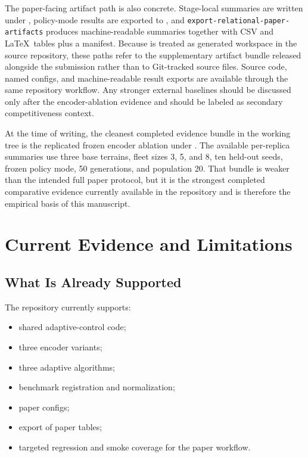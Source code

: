 \documentclass[a4paper,fleqn]{cas-sc}
\begin{document}
The paper-facing artifact path is also concrete. Stage-local summaries are written under , policy-mode results are exported to , and \texttt{export-relational-paper-artifacts} produces machine-readable summaries together with CSV and \LaTeX\ tables plus a manifest. Because  is treated as generated workspace in the source repository, these paths refer to the supplementary artifact bundle released alongside the submission rather than to Git-tracked source files. Source code, named configs, and machine-readable result exports are available through the same repository workflow. Any stronger external baselines should be discussed only after the encoder-ablation evidence and should be labeled as secondary competitiveness context.

At the time of writing, the cleanest completed evidence bundle in the working tree is the replicated frozen encoder ablation under . The available per-replica summaries use three base terrains, fleet sizes 3, 5, and 8, ten held-out seeds, frozen policy mode, 50 generations, and population 20. That bundle is weaker than the intended full paper protocol, but it is the strongest completed comparative evidence currently available in the repository and is therefore the empirical basis of this manuscript.

\section{Current Evidence and Limitations}

\subsection{What Is Already Supported}

The repository currently supports:
\begin{itemize}
\item shared adaptive-control code;
\item three encoder variants;
\item three adaptive algorithms;
\item benchmark registration and normalization;
\item paper configs;
\item export of paper tables;
\item targeted regression and smoke coverage for the paper workflow.
\end{itemize}
\end{document}
